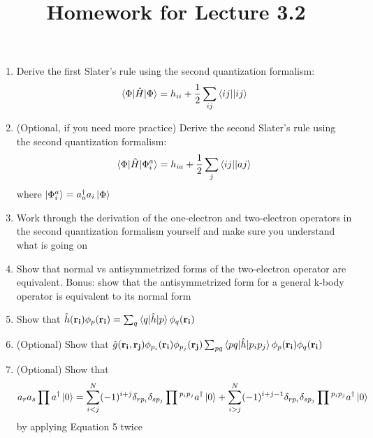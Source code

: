 \documentclass{article}
\title{Homework for Lecture 3.2 }
\date{}
\newcommand{\dg}{\ensuremath{^\dagger} }
\def\*#1{\mathbf{#1}}
\begin{document}
\maketitle
\noindent
\begin{enumerate}
\item Derive the first Slater's rule using the second quantization formalism: 
\[\braket{\Phi | \hat{H} | \Phi} = h_{ii} + \frac{1}{2} \sum_{ij} \braket{ij || ij} \]
\item (Optional, if you need more practice) Derive the second Slater's rule using the second quantization formalism: 
\[\braket{\Phi | \hat{H} | \Phi_i^a } = h_{ia} + \frac{1}{2} \sum_{j} \braket{ij || aj} \]
where $\ket{\Phi_i^a } = a_a\dg a_i \ket{\Phi}$
\item Work through the derivation of the one-electron and two-electron operators in the second quantization formalism yourself and make sure you understand what is going on 
\item Show that normal vs antisymmetrized forms of the two-electron operator are equivalent. Bonus: show that the antisymmetrized form for a general k-body operator is equivalent to its normal form 
\item Show that $\hat{h}(\*{r_i}) \phi_p (\*{r_i})  = \sum_q \braket{q | \hat{h} | p } \phi_q (\*{r_i}) $
\item (Optional) Show that $\hat{g}(\*{r_i}, \*{r_j}) \phi_{p_i} (\*{r_i}) \phi_{p_j} (\*{r_j})  \sum_{pq} \braket{pq | \hat{h} | p_i p_j  }  \phi_p (\*{r_i})  \phi_q (\*{r_i})$
\item (Optional) Show that 
\[a_r a_s \prod a\dg \ket{0} = \sum\limits_{i < j} ^N  (-1)^{i + j }   \delta_{rp_i} \delta_{sp_j}  \prod{}^{p_ip_j} a\dg \ket{0} + 
\sum\limits_{i > j} ^N  (-1)^{i + j -1} \delta_{rp_i} \delta_{sp_j} \prod{}^{p_ip_j}a\dg \ket{0} \]
by applying Equation 5 twice 
\end{enumerate}
\end{document}
